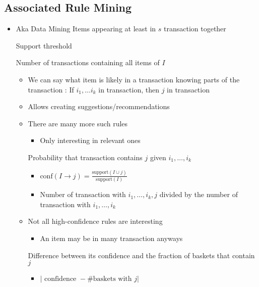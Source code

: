 \subsection{Associated Rule Mining}
\begin{itemize}
    \item Aka Data Mining
     Items appearing at least in $s$ transaction together
        \begin{itemize}
             Support threshold
        \end{itemize}
     Number of transactions containing all items of $I$
        \begin{itemize}
            \item We can say what item is likely in a transaction knowing parts of the transaction
            : If $i_1, \dots i_k$ in transaction, then $j$ in transaction
            \item Allows creating suggestions/recommendations
            \item There are many more such rules
                \begin{itemize}
                    \item Only interesting in relevant ones
                \end{itemize}
             Probability that transaction contains $j$ given $i_1, \dots, i_k$
                \begin{itemize}
                    \item $\text{conf}(I \to j) = \frac{\text{support}(I \cup j)}{\text{support}(I)}$
                    \item Number of transaction with $i_1, \dots, i_k, j$ divided by the number of transaction with $i_1, \dots, i_k$
                \end{itemize}
            \item Not all high-confidence rules are interesting
                \begin{itemize}
                    \item An item may be in many transaction anyways
                \end{itemize}
             Difference between its confidence and the fraction of baskets that contain $j$
                \begin{itemize}
                    \item $| \text{ confidence } - \text{\# baskets with } j |$

\end{itemize}
\end{itemize}
\end{itemize}
